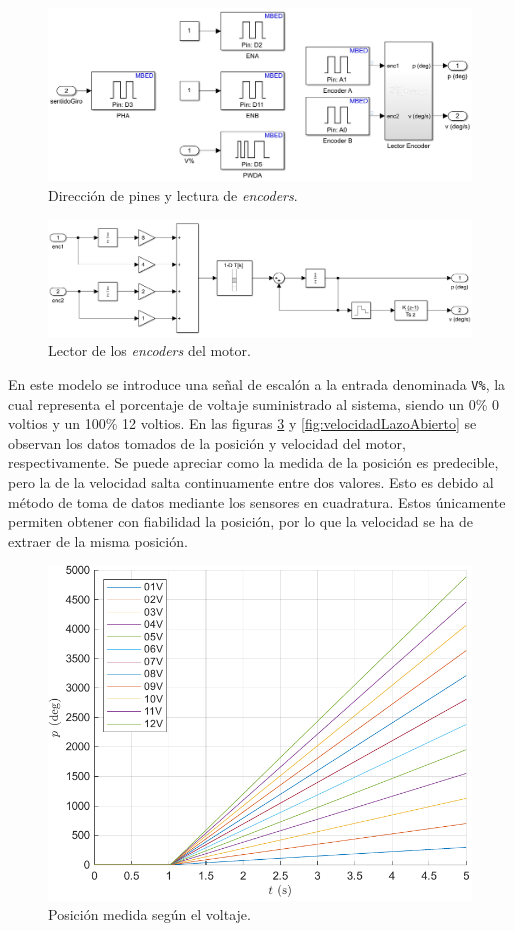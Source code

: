 \documentclass{article}
\newcommand{\code}[1]{\colorbox{light-gray}{\texttt{#1}}}
\begin{document}
\begin{figure}[H]
    \centering
    \includegraphics[width=0.75\linewidth]{img/modeloLazoAbiertoPines.png}
    \caption{Dirección de pines y lectura de \textit{encoders}.}
    \label{fig:modeloLazoAbiertoPines}
\end{figure}

\begin{figure}[H]
    \centering
    \includegraphics[width=0.75\linewidth]{img/lectorEncoders.png}
    \caption{Lector de los \textit{encoders} del motor.}
    \label{fig:lectorEncoders}
\end{figure}

En este modelo se introduce una señal de escalón a la entrada denominada \code{V\%}, la cual representa el porcentaje de voltaje suministrado al sistema, siendo un 0\% 0 voltios y un 100\% 12 voltios. En las figuras \ref{fig:posicionLazoAbierto} y \ref{fig:velocidadLazoAbierto} se observan los datos tomados de la posición y velocidad del motor, respectivamente. Se puede apreciar como la medida de la posición es predecible, pero la de la velocidad salta continuamente entre dos valores. Esto es debido al método de toma de datos mediante los sensores en cuadratura. Estos únicamente permiten obtener con fiabilidad la posición, por lo que la velocidad se ha de extraer de la misma posición.

\begin{figure}[H]
    \centering
    \includegraphics[width=0.75\linewidth]{img/posicionLazoAbierto.pdf}
    \caption{Posición medida según el voltaje.}
    \label{fig:posicionLazoAbierto}
\end{figure}
\end{document}
